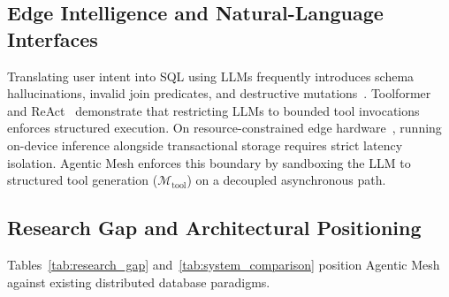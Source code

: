 \subsection{Edge Intelligence and Natural-Language Interfaces}
Translating user intent into SQL using LLMs frequently introduces schema hallucinations, invalid join predicates, and destructive mutations~\cite{ji2023hallucination, singh2025llmtexttosql}. Toolformer~\cite{schick2023toolformer} and ReAct~\cite{yao2023react} demonstrate that restricting LLMs to bounded tool invocations enforces structured execution. On resource-constrained edge hardware~\cite{satyanarayanan2017emergence}, running on-device inference alongside transactional storage requires strict latency isolation. Agentic Mesh enforces this boundary by sandboxing the LLM to structured tool generation ($\mathcal{M}_{\text{tool}}$) on a decoupled asynchronous path.

\subsection{Research Gap and Architectural Positioning}
Tables~\ref{tab:research_gap} and~\ref{tab:system_comparison} position Agentic Mesh against existing distributed database paradigms.

\begin{table}[!t]
\caption{Architectural Comparison Across System Classes}
\label{tab:research_gap}
\centering
{}
\end{table}

